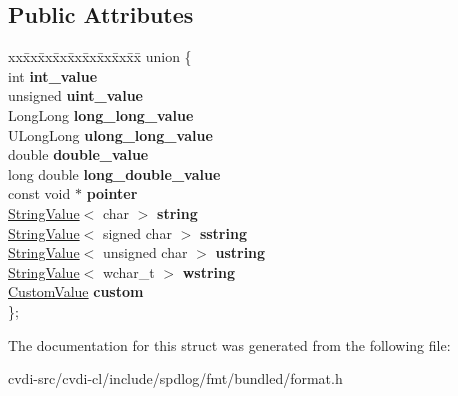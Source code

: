 \subsection*{Public Attributes}
\begin{DoxyCompactItemize}
\item 
\begin{tabbing}
xx\=xx\=xx\=xx\=xx\=xx\=xx\=xx\=xx\=\kill
union \{\\
\>int {\bfseries int\_value}\\
\>unsigned {\bfseries uint\_value}\\
\>LongLong {\bfseries long\_long\_value}\\
\>ULongLong {\bfseries ulong\_long\_value}\\
\>double {\bfseries double\_value}\\
\>long double {\bfseries long\_double\_value}\\
\>const void $\ast$ {\bfseries pointer}\\
\>\hyperlink{structfmt_1_1internal_1_1Value_1_1StringValue}{StringValue}$<$ char $>$ {\bfseries string}\\
\>\hyperlink{structfmt_1_1internal_1_1Value_1_1StringValue}{StringValue}$<$ signed char $>$ {\bfseries sstring}\\
\>\hyperlink{structfmt_1_1internal_1_1Value_1_1StringValue}{StringValue}$<$ unsigned char $>$ {\bfseries ustring}\\
\>\hyperlink{structfmt_1_1internal_1_1Value_1_1StringValue}{StringValue}$<$ wchar\_t $>$ {\bfseries wstring}\\
\>\hyperlink{structfmt_1_1internal_1_1Value_1_1CustomValue}{CustomValue} {\bfseries custom}\\
\}; \hypertarget{structfmt_1_1internal_1_1Value_abee01a135224a5fda926c6f585d2e682}{}\label{structfmt_1_1internal_1_1Value_abee01a135224a5fda926c6f585d2e682}
\\

\end{tabbing}\end{DoxyCompactItemize}


The documentation for this struct was generated from the following file\+:\begin{DoxyCompactItemize}
\item 
cvdi-\/src/cvdi-\/cl/include/spdlog/fmt/bundled/format.\+h\end{DoxyCompactItemize}
